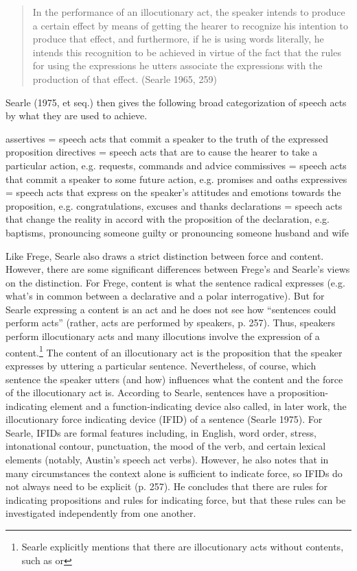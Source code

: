 \begin{quote}
    

In the performance of an illocutionary act, the speaker intends to produce a certain effect by means of getting the hearer to recognize his intention to produce that effect, and furthermore, if he is using words literally, he intends this recognition to be achieved in virtue of the fact that the rules for using the expressions he utters associate the expressions with the production of that effect. \hfill (Searle 1965, 259)
\end{quote}

Searle (1975, et seq.) then gives the following broad categorization of speech acts by what they are used to achieve.

\bxl
assertives = speech acts that commit a speaker to the truth of the expressed proposition
\ex directives = speech acts that are to cause the hearer to take a particular action, e.g. requests, commands and advice
\ex commissives = speech acts that commit a speaker to some future action, e.g. promises and oaths
\ex expressives = speech acts that express on the speaker's attitudes and emotions towards the proposition, e.g. congratulations, excuses and thanks
\ex declarations = speech acts that change the reality in accord with the proposition of the declaration, e.g. baptisms, pronouncing someone guilty or pronouncing someone husband and wife
\exl
\eex

Like Frege, Searle also draws a strict distinction between force and content. However, there are some significant differences between Frege’s and Searle’s views on the distinction. For Frege, content is what the sentence radical expresses (e.g. what’s in common between a declarative and a polar interrogative). But for Searle expressing a content is an act and he does not see how “sentences could perform acts” (rather, acts are performed by speakers, p. 257). Thus, speakers perform illocutionary acts and many illocutions involve the expression of a content.\footnote{Searle explicitly mentions that there are illocutionary acts without contents, such as  or } The content of an illocutionary act is the proposition that the speaker expresses by uttering a particular sentence. Nevertheless, of course, which sentence the speaker utters (and how) influences what the content and the force of the illocutionary act is. According to Searle, sentences have a proposition-indicating element and a function-indicating device also called, in later work, the illocutionary force indicating device (IFID) of a sentence (Searle 1975). For Searle, IFIDs are formal features including, in English, word order, stress, intonational contour, punctuation, the mood of the verb, and certain lexical elements (notably, Austin’s speech act verbs). However, he also notes that in many circumstances the context alone is sufficient to indicate force, so IFIDs do not always need to be explicit (p. 257). He concludes that there are rules for indicating propositions and rules for indicating force, but that these rules can be investigated independently from one another. 

